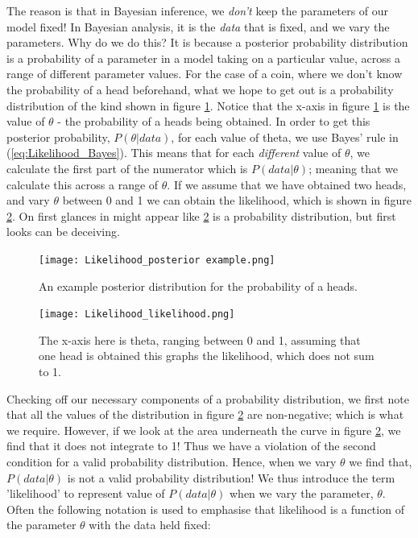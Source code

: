 \documentclass[11pt,fullpage]{book}
\begin{document}
The reason is that in Bayesian inference, we \textit{don't} keep the parameters of our model fixed! In Bayesian analysis, it is the \textit{data} that is fixed, and we vary the parameters. Why do we do this? It is because a posterior probability distribution is a probability of a parameter in a model taking on a particular value, across a range of different parameter values. For the case of a coin, where we don't know the probability of a head beforehand, what we hope to get out is a probability distribution of the kind shown in figure \ref{fig:Likelihood_posteriorExample}. Notice that the x-axis in figure \ref{fig:Likelihood_posteriorExample} is the value of $\theta$ - the probability of a heads being obtained. In order to get this posterior probability, $P(\theta|data)$, for each value of theta, we use Bayes' rule in (\ref{eq:Likelihood_Bayes}). This means that for each \textit{different} value of $\theta$, we calculate the first part of the numerator which is $P(data|\theta)$; meaning that we calculate this across a range of $\theta$. If we assume that we have obtained two heads, and vary $\theta$ between 0 and 1 we can obtain the likelihood, which is shown in figure \ref{fig:Likelihood_coinLikelihood}. On first glances in might appear like \ref{fig:Likelihood_coinLikelihood} is a probability distribution, but first looks can be deceiving. 

\begin{figure}
\centering
\scalebox{0.25} 
{\texttt{[image: Likelihood\_posterior example.png]}}
\caption{An example posterior distribution for the probability of a heads.}\label{fig:Likelihood_posteriorExample}
\end{figure}

\begin{figure}
\centering
\scalebox{0.25} 
{\texttt{[image: Likelihood\_likelihood.png]}}
\caption{The x-axis here is theta, ranging between 0 and 1, assuming that one head is obtained this graphs the likelihood, which does not sum to 1.}\label{fig:Likelihood_coinLikelihood}
\end{figure}

Checking off our necessary components of a probability distribution, we first note that all the values of the distribution in figure \ref{fig:Likelihood_coinLikelihood} are non-negative; which is what we require. However, if we look at the area underneath the curve in figure \ref{fig:Likelihood_coinLikelihood}, we find that it does not integrate to 1! Thus we have a violation of the second condition for a valid probability distribution. Hence, when we vary $\theta$ we find that, $P(data|\theta)$ is not a valid probability distribution! We thus introduce the term 'likelihood' to represent value of $P(data|\theta)$ when we vary the parameter, $\theta$. Often the following notation is used to emphasise that likelihood is a function of the parameter $\theta$ with the data held fixed:
\end{document}
